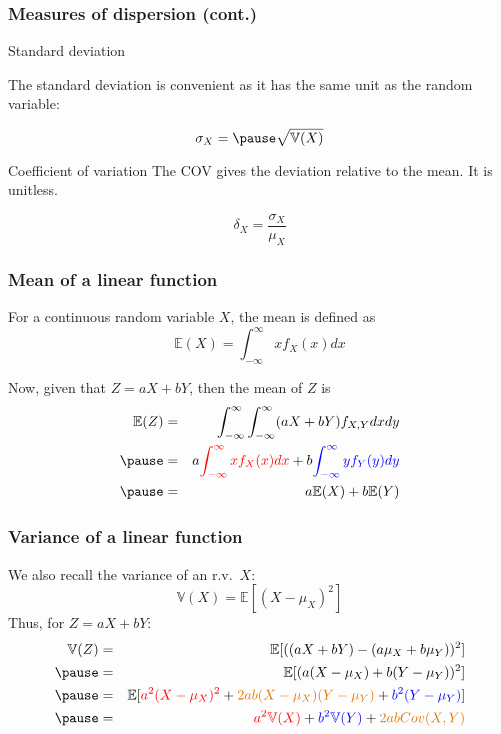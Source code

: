 \documentclass[usenames,dvipsnames,smaller]{beamer}
\newcommand{\?}{\stackrel{?}{=}}
\newcommand{\rd}{\color{red}}
\newcommand{\bl}{\color{blue}}
\newcommand{\og}{\color{orange!90!black}}
\begin{document}
\begin{frame}
  \frametitle{Measures of dispersion (cont.)}
  \pause

  \begin{block}{Standard deviation}
    \pause

    The standard deviation is convenient as it has the same unit as the random variable:\pause

    \begin{equation}
      \label{eq:4}
      \sigma_X = \pause \sqrt{\mathbb{V}(X)}
    \end{equation}
  \end{block}
  
  \pause

  \begin{block}{Coefficient of variation}
    The COV gives the deviation relative to the mean. It is unitless.\pause

    \begin{equation}
      \label{eq:5}
      \delta_X = \frac{\sigma_X}{\mu_X}
    \end{equation}
  \end{block}
  
\end{frame}


\begin{frame}
  \frametitle{Mean of a linear function}\pause
  For a continuous random variable $X$, the mean is defined as\pause
  \begin{equation}
    \label{eq:30}
    \mathbb{E}(X) = \int_{-\infty}^\infty xf_X(x) dx
  \end{equation}
  \pause
  
  Now, given that $Z = aX + bY$, then the mean of $Z$ is\pause
  \begin{eqnarray*}
    \mathbb{E}(Z) &=& \int_{-\infty}^\infty\int_{-\infty}^\infty (aX + bY)f_{X,Y}dxdy \\\pause
         &=& a {\rd \int_{-\infty}^\infty x f_X(x)dx } +  b {\bl \int_{-\infty}^\infty y f_Y(y)dy }\\\pause
         &=& a\mathbb{E}(X) + b\mathbb{E}(Y)
  \end{eqnarray*}
\end{frame}

\begin{frame}
  \frametitle{Variance of a linear function}
  \pause
  We also recall the variance of an r.v.\ $X$:
  \begin{equation}
    \label{eq:31}
    \mathbb{V}(X) = \mathbb{E}[(X - \mu_X)^2]
  \end{equation}
  \pause
  Thus, for $Z = aX + bY$:\pause
  \begin{eqnarray*}
    \mathbb{V}(Z) &=& \mathbb{E}[((aX + bY) - (a\mu_X + b\mu_Y))^2] \\\pause
           &=& \mathbb{E}[(a(X - \mu_X) + b(Y - \mu_Y))^2] \\\pause
           &=& \mathbb{E}[{\rd a^2(X - \mu_X)^2} + {\og  2ab(X - \mu_X)(Y - \mu_Y) } + {\bl b^2(Y - \mu_Y)} ]\\\pause
           &=& {\rd a^2\mathbb{V}(X)} + {\bl b^2\mathbb{V}(Y) } + {\og 2ab Cov(X,Y)}
  \end{eqnarray*}
\end{frame}
\end{document}
